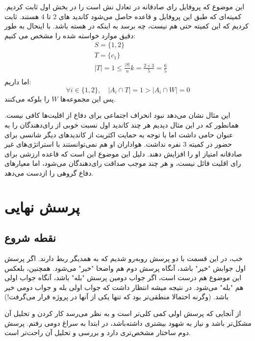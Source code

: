 \documentclass[12pt]{article}
\begin{document}
\begin{enumerate}
{        این موضوع که پروفایل رای صادقانه در 
        تعادل نش است را در بخش اول ثابت کردیم. کمیته‌ای که طبق این پروفایل
        و قاعده
        حاصل می‌شود کاندید های $2$
        تا
        $4$
        هستند. ثابت کردیم که این کمیته حتی 
        هم نیست، چه برسد به اینکه در هسته باشد. با اینحال به طور دقیق موارد
        خواسته شده را مشخص می کنیم:
        \begin{align*}
            &S = \{1, 2\} \\
            &T = \{c_1\} \\
            &|T| = 1 \le \frac{|S|}{n}k = \frac{2\times 3}{5} = \frac{6}{5} \\
        \end{align*}
        اما داریم:
        \[
        \forall i \in \{1, 2\},  \quad
    \left| A_i \cap T \right| = 1 > \left| A_i \cap W\right| = 0
        \]
        پس این مجموعه‌ها $W$ را 
        بلوکه می‌کنند.

        این مثال نشان می‌دهد نبود انحراف اجتماعی برای دفاع از اقلیت‌ها کافی نیست. همانطور
        که در این مثال دیدیم هر چند کاندید اول نسبت خوبی از رای‌دهندگان را به عنوان حامی داشت
        اما با توجه به حمایت اکثریت از کاندیدهای دیگر شانسی برای حضور در کمیته $3$
        نفره نداشت. هواداران او هم نمی‌توانستند با استراتژی‌های غیر صادقانه امتیاز
        او را افزایش دهند. دلیل این موضوع این است که قاعده 
        ارزشی برای رای اقلیت قائل نیست، و هر چند موجب صداقت رای‌دهندگان
        می‌شود، اما معیارهای دفاع گروهی را ازدست می‌دهد.


    }
\end{enumerate}

\newpage

\section{پرسش نهایی}
\subsection{نقطه شروع}
خب، در این قسمت با دو پرسش روبه‌رو شدیم که به همدیگر ربط دارند.
اگر پرسش اول جوابش "خیر" باشد، آنگاه پرسش دوم هم واضحا
"خیر" 
می‌شود. همچنین، بلعکس این موضوع هم درست است، اگر جواب دومین پرسش
"بله"
باشد، آنگاه جواب اولی هم "بله" می‌شود. در نتیجه میشه انتظار داشت
که جواب اولی بله و جواب دومی خیر باشد. (وگرنه
احتمالا منطقی‌تر بود که تنها یکی از آنها در پروژه قرار می‌گرفت!)

از آنجایی که پرسش اولی کمی کلی‌تر است و به نظر می‌رسد کار کردن و تحلیل آن
مشکل‌تر باشد و نیاز به شهود بیشتری داشته‌باشد، در ابتدا به سراغ دومی رفتم.
پرسش دوم ساختار مشخص‌تری دارد و بررسی و تحلیل آن راحت‌تر است.
\end{document}
